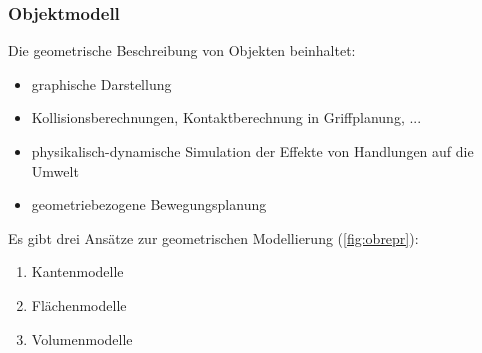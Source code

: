 \subsubsection{Objektmodell}
Die geometrische Beschreibung von Objekten beinhaltet:
\begin{itemize}
\setlength\itemsep{0em}
\item graphische Darstellung
\item Kollisionsberechnungen, Kontaktberechnung in Griffplanung, ...
\item physikalisch-dynamische Simulation der Effekte von Handlungen auf die Umwelt
\item geometriebezogene Bewegungsplanung
\end{itemize}
Es gibt drei Ansätze zur geometrischen Modellierung (\autoref{fig:obrepr}): 
\begin{enumerate}
\item Kantenmodelle
\item Flächenmodelle
\item Volumenmodelle
\end{enumerate}
